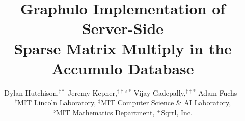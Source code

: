 \documentclass[conference]{IEEEtran}
\begin{document}
\title{Graphulo Implementation of Server-Side \\ Sparse Matrix Multiply in the Accumulo Database}



\author[D. Hutchison et al.]
       {Dylan Hutchison,$^{{\dagger}*}$ Jeremy Kepner,$^{{\dagger}{\ddagger}{\diamond}*}$ Vijay Gadepally,$^{{\dagger}{\ddagger}*}$ Adam Fuchs$^+$ \vspace{6pt}
         \\
         $^{\dagger}$MIT Lincoln Laboratory, 
         $^{\ddagger}$MIT Computer Science \& AI Laboratory, \\
         $^{\diamond}$MIT Mathematics Department, 
         $^+$Sqrrl, Inc. \vspace{-1em}
       }


%
\end{document}
